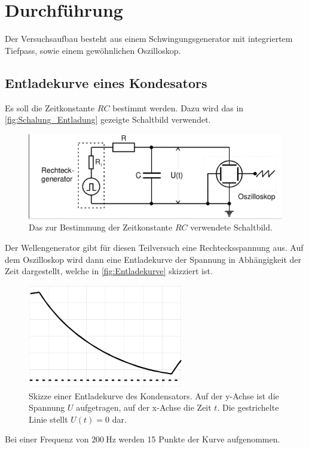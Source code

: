 \section{Durchführung}
\label{sec:Durchführung}
Der Versuchsaufbau besteht aus einem Schwingungsgenerator mit
integriertem Tiefpass, sowie einem gewöhnlichen Oszilloskop.
\subsection{Entladekurve eines Kondesators}
Es soll die Zeitkonstante $RC$ bestimmt werden. Dazu wird das in 
\autoref{fig:Schalung_Entladung} gezeigte Schaltbild verwendet.
\begin{figure}
    \centering
    \includegraphics[width=\textwidth]{messdaten/Schaltung_Entladung.png}
    \caption{Das zur Bestimmung der Zeitkonstante $RC$ verwendete Schaltbild.}
    \label{fig:Schalung_Entladung}
\end{figure}
Der Wellengenerator gibt für diesen Teilversuch eine Rechtecksspannung aus.
Auf dem Oszilloskop wird dann eine Entladekurve der Spannung in Abhängigkeit
der Zeit dargestellt, welche in \autoref{fig:Entladekurve} skizziert ist.
\begin{figure}
    \centering
    \includegraphics[height=4.5cm]{messdaten/Entladekurve.png}
    \caption{Skizze einer Entladekurve des Kondensators. Auf der y-Achse ist
    die Spannung $U$ aufgetragen, auf der x-Achse die Zeit $t$. Die gestrichelte
    Linie stellt $U(t)=0$ dar.}
    \label{fig:Entladekurve}
\end{figure}
Bei einer Frequenz von $\qty{200}{\hertz}$ werden 15 Punkte der Kurve aufgenommen. 
